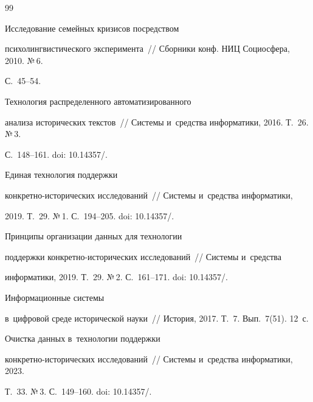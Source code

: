 {\small\frenchspacing


{%




\begin{thebibliography}{99}




   Исследование семейных кризисов посредством 


психолингвистического эксперимента~/\!\!/ Сборники конф. НИЦ Социосфера, 2010. №\,6. 


С.~45--54.




   Технология распределенного автоматизированного 


анализа исторических текстов~/\!\!/ Системы и~средства информатики, 2016. Т.~26. №\,3. 


С.~148--161. doi: 10.14357\!/.




   Единая технология поддержки  


кон\-крет\-но-ис\-то\-ри\-че\-ских исследований~/\!\!/ Системы и~средства информатики, 


2019. Т.~29. №\,1. С.~194--205. doi: 10.14357\!/.




   Принципы организации данных для технологии 


поддержки кон\-крет\-но-ис\-то\-ри\-че\-ских исследований~/\!\!/ Системы и~средства 


информатики, 2019. Т.~29. №\,2. С.~161--171. doi: 10.14357\!/.




   Информационные системы 


в~циф\-ро\-вой среде исторической науки~/\!\!/ История, 2017. Т.~7. Вып.~7(51). 12~с.




   Очистка данных в~технологии поддержки 


кон\-крет\-но-ис\-то\-ри\-че\-ских исследований~/\!\!/ Системы и~средства информатики, 2023. 


Т.~33. №\,3. С.~149--160. doi: 10.14357\!/.



\end{thebibliography}}}
